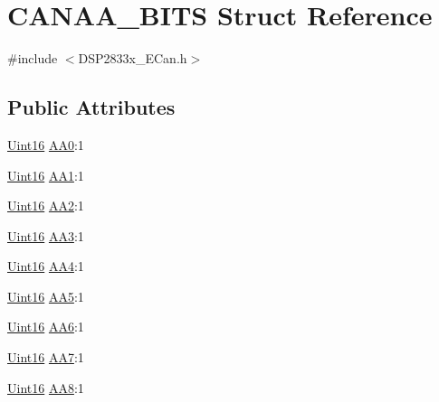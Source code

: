 \hypertarget{struct_c_a_n_a_a___b_i_t_s}{}\section{C\+A\+N\+A\+A\+\_\+\+B\+I\+T\+S Struct Reference}
\label{struct_c_a_n_a_a___b_i_t_s}


{\ttfamily \#include $<$D\+S\+P2833x\+\_\+\+E\+Can.\+h$>$}

\subsection*{Public Attributes}
\begin{DoxyCompactItemize}
\item 
\hyperlink{_d_s_p2833x___device_8h_a59a9f6be4562c327cbfb4f7e8e18f08b}{Uint16} \hyperlink{struct_c_a_n_a_a___b_i_t_s_a1f67dad2c9799632fb593404cf3851ec}{A\+A0}\+:1
\item 
\hyperlink{_d_s_p2833x___device_8h_a59a9f6be4562c327cbfb4f7e8e18f08b}{Uint16} \hyperlink{struct_c_a_n_a_a___b_i_t_s_a2ad0cfd3dd3a7a84d1161e774cbd1e19}{A\+A1}\+:1
\item 
\hyperlink{_d_s_p2833x___device_8h_a59a9f6be4562c327cbfb4f7e8e18f08b}{Uint16} \hyperlink{struct_c_a_n_a_a___b_i_t_s_a3e2524841b9b7ea6ad7be6ae8fb80fc6}{A\+A2}\+:1
\item 
\hyperlink{_d_s_p2833x___device_8h_a59a9f6be4562c327cbfb4f7e8e18f08b}{Uint16} \hyperlink{struct_c_a_n_a_a___b_i_t_s_a082829db124dd0a11ae9ccdbf7b86814}{A\+A3}\+:1
\item 
\hyperlink{_d_s_p2833x___device_8h_a59a9f6be4562c327cbfb4f7e8e18f08b}{Uint16} \hyperlink{struct_c_a_n_a_a___b_i_t_s_a6288023ea8097b4ca34d508320973105}{A\+A4}\+:1
\item 
\hyperlink{_d_s_p2833x___device_8h_a59a9f6be4562c327cbfb4f7e8e18f08b}{Uint16} \hyperlink{struct_c_a_n_a_a___b_i_t_s_ae9af8749102fdc6ea31398da15b8ac0e}{A\+A5}\+:1
\item 
\hyperlink{_d_s_p2833x___device_8h_a59a9f6be4562c327cbfb4f7e8e18f08b}{Uint16} \hyperlink{struct_c_a_n_a_a___b_i_t_s_aaf5a2e8c1878772500c36416e01b7fda}{A\+A6}\+:1
\item 
\hyperlink{_d_s_p2833x___device_8h_a59a9f6be4562c327cbfb4f7e8e18f08b}{Uint16} \hyperlink{struct_c_a_n_a_a___b_i_t_s_a934fe2d9c2e6ddba01f88d302123b866}{A\+A7}\+:1
\item 
\hyperlink{_d_s_p2833x___device_8h_a59a9f6be4562c327cbfb4f7e8e18f08b}{Uint16} \hyperlink{struct_c_a_n_a_a___b_i_t_s_ac5a84eb1b515f4533a9b7e7a76347010}{A\+A8}\+:1

\end{DoxyCompactItemize}
